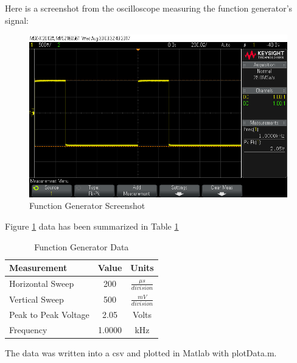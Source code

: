 \documentclass[journal,onecolumn]{IEEEtran}
\begin{document}
Here is a screenshot from the oscilloscope measuring the function generator's signal:
\begin{figure}[H]
	\includegraphics[width=18cm]{functionGenerator_2.png}
	\centering
	\caption{Function Generator Screenshot}
	\label{fig:fgs}
\end{figure}
\newpage
Figure \ref{fig:fgs} data has been summarized in Table \ref{tab:fg}
\begin{table}[H]
	\centering
	\caption{Function Generator Data}
	\label{tab:fg}
	\begin{tabular}{|l|c|c|}
		\hline
		\textbf{Measurement} & \textbf{Value} & \textbf{Units}           \\ \hline
		\rule{0pt}{4ex}  Horizontal Sweep     & 200            & $\frac{\mu s}{division}$ \\ \hline
		\rule{0pt}{4ex}  Vertical Sweep       & 500            & $\frac{mV}{division}$    \\ \hline
		\rule{0pt}{4ex}  Peak to Peak Voltage & 2.05           & Volts                    \\ \hline
		\rule{0pt}{4ex}  Frequency            & 1.0000         & kHz                      \\ \hline
	\end{tabular}
\end{table}
The data was written into a csv and plotted in Matlab with plotData.m.

\end{document}
